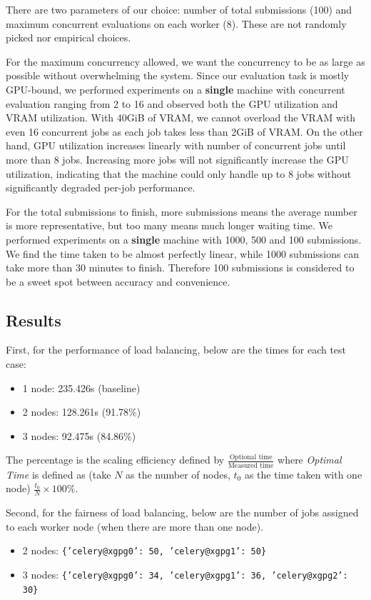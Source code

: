 There are two parameters of our choice: number of total submissions (100) and maximum concurrent evaluations on each worker (8). These are not randomly picked nor empirical choices.

For the maximum concurrency allowed, we want the concurrency to be as large as possible without overwhelming the system. Since our evaluation task is mostly GPU-bound, we performed experiments on a \textbf{single} machine with concurrent evaluation ranging from 2 to 16 and observed both the GPU utilization and VRAM utilization. With 40GiB of VRAM, we cannot overload the VRAM with even 16 concurrent jobs as each job takes less than 2GiB of VRAM. On the other hand, GPU utilization increases linearly with number of concurrent jobs until more than 8 jobs. Increasing more jobs will not significantly increase the GPU utilization, indicating that the machine could only handle up to 8 jobs without significantly degraded per-job performance.

For the total submissions to finish, more submissions means the average number is more representative, but too many means much longer waiting time. We performed experiments on a \textbf{single} machine with 1000, 500 and 100 submissions. We find the time taken to be almost perfectly linear, while 1000 submissions can take more than 30 minutes to finish. Therefore 100 submissions is considered to be a sweet spot between accuracy and convenience.

\subsection{Results}
\label{ss:load-balancing-exp-results}

First, for the performance of load balancing, below are the times for each test case:
\begin{itemize}
    \item 1 node: 235.426s (baseline)
    \item 2 nodes: 128.261s (91.78\%)
    \item 3 nodes: 92.475s (84.86\%)
\end{itemize}
The percentage is the scaling efficiency defined by $\frac{\text{Optional time}}{\text{Measured time}}$ where \emph{Optimal Time} is defined as (take $N$ as the number of nodes, $t_0$ as the time taken with one node) $\frac{t_0}{N} \times 100\%$.

Second, for the fairness of load balancing, below are the number of jobs assigned to each worker node (when there are more than one node).
\begin{itemize}
    \item 2 nodes: \texttt{\{'celery@xgpg0': 50, 'celery@xgpg1': 50\}}
    \item 3 nodes: \texttt{\{'celery@xgpg0': 34, 'celery@xgpg1': 36, 'celery@xgpg2': 30\}}
\end{itemize}

